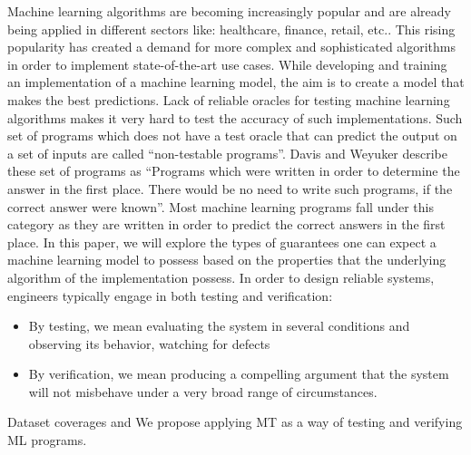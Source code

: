 Machine learning algorithms are becoming increasingly popular and are already being applied in different sectors like: healthcare, finance, retail, etc.. This rising popularity has created a demand for more complex and sophisticated algorithms in order to implement state-of-the-art use cases. While developing and training an implementation of a machine learning model, the aim is to create a model that makes the best predictions.
Lack of reliable oracles for testing machine learning algorithms makes it very hard to test the accuracy of such implementations. Such set of programs which does not have a test oracle that can predict the output on a set of inputs are called \enquote{non-testable programs}\cite{Murphy}. Davis and Weyuker describe these set of programs as \enquote{Programs which were written in order to determine the answer in the first place. There would be no need to write such programs, if the correct answer were known}. Most machine learning programs fall under this category as they are written in order to predict the correct answers in the first place. In this paper, we will explore the types of guarantees one can expect a machine learning model to possess based on the properties that the underlying algorithm of the implementation possess.
\newline
In order to design reliable systems, engineers typically engage in both testing and verification:
\begin{itemize}
  \item By testing, we mean evaluating the system in several conditions and observing its behavior, watching for defects

  \item By verification, we mean producing a compelling argument that the system will not misbehave under a very broad range of circumstances.
\end{itemize}

Dataset coverages
and
We propose applying MT as a way of testing and verifying ML programs.

